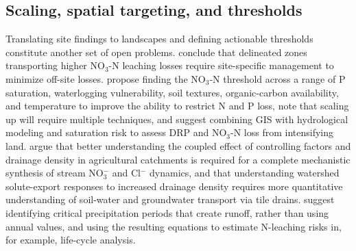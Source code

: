 \subsection{Scaling, spatial targeting, and thresholds}
Translating site findings to landscapes and defining actionable thresholds constitute another set of open problems. \textcite{Bakhsh2005b} conclude that delineated zones transporting higher NO$_3$-N leaching losses require site-specific management to minimize off-site losses. \textcite{Smith2023} propose finding the NO$_3$-N threshold across a range of P saturation, waterlogging vulnerability, soil textures, organic-carbon availability, and temperature to improve the ability to restrict N and P loss, note that scaling up will require multiple techniques, and suggest combining GIS with hydrological modeling and saturation risk to assess DRP and NO$_3$-N loss from intensifying land. \textcite{Kennedy2012} argue that better understanding the coupled effect of controlling factors and drainage density in agricultural catchments is required for a complete mechanistic synthesis of stream NO$_3^-$ and Cl$^-$ dynamics, and that understanding watershed solute-export responses to increased drainage density requires more quantitative understanding of soil-water and groundwater transport via tile drains. \textcite{Salo2006} suggest identifying critical precipitation periods that create runoff, rather than using annual values, and using the resulting equations to estimate N-leaching risks in, for example, life-cycle analysis.

